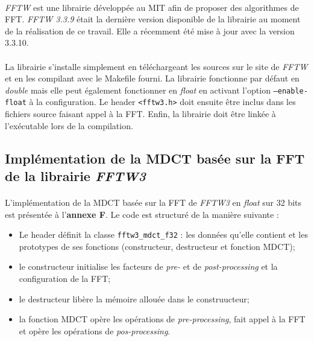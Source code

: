 \documentclass{article}
\begin{document}
    \paragraph{}
    \emph{FFTW} est une librairie développée au MIT afin de proposer des algorithmes de FFT\cite{FFTW05}. \emph{FFTW 3.3.9} était la dernière version disponible de la librairie au moment de la réalisation de ce travail. Elle a récemment été mise à jour avec la version 3.3.10.

    \paragraph{}
    La librairie s'installe simplement en téléchargeant les sources sur le site de \emph{FFTW}\cite{fftw} et en les compilant avec le Makefile fourni. La librairie fonctionne par défaut en \emph{double} mais elle peut également fonctionner en \emph{float} en activant l'option \texttt{--enable-float} à la configuration. Le header \texttt{<fftw3.h>} doit ensuite être inclus dans les fichiers source faisant appel à la FFT. Enfin, la librairie doit être linkée à l'exécutable lors de la compilation.


    \subsection{Implémentation de la MDCT basée sur la FFT de la librairie \emph{FFTW3}}

    \paragraph{}
    L'implémentation de la MDCT basée sur la FFT de \emph{FFTW3} en \emph{float} sur 32 bits est présentée à l'\textbf{annexe F}. Le code est structuré de la manière suivante :
    \begin{itemize}
        \item Le header définit la classe \texttt{fftw3\_mdct\_f32} : les données qu'elle contient et les prototypes de ses fonctions (constructeur, destructeur et fonction MDCT);
        \item le constructeur initialise les facteurs de \emph{pre-} et de \emph{post-processing} et la configuration de la FFT;
        \item le destructeur libère la mémoire allouée dans le construucteur;
        \item la fonction MDCT opère les opérations de \emph{pre-processing}, fait appel à la FFT et opère les opérations de \emph{pos-processing}.
    \end{itemize}
\end{document}
